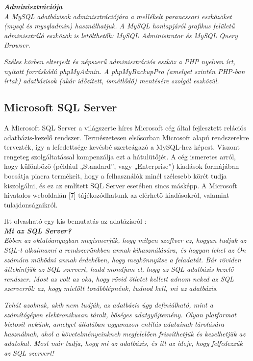 \noindent\textit{\textbf{Adminisztrációja}}\\

\textit{A MySQL adatbázisok adminisztrációjára a mellékelt parancssori eszközöket (mysql és mysqladmin) használhatjuk. A MySQL honlapjáról grafikus felületű adminisztráló eszközök is letölthetők: MySQL Administrator és MySQL Query Browser.}

\textit{Széles körben elterjedt és népszerű adminisztrációs eszköz a PHP nyelven írt, nyitott forráskódú phpMyAdmin. A phpMyBackupPro (amelyet szintén PHP-ban írtak) adatbázisok (akár időzített, ismétlődő) mentésére szolgál eszközül.}


\subsection{Microsoft SQL Server}

A Microsoft SQL Server a világszerte híres Microsoft cég által fejlesztett relációs adatbázis-kezelő rendszer.
Természetesen elsősorban Microsoft alapú rendszerekre tervezték, így a lefedettsége kevésbé szerteágazó a MySQL-hez képest. Viszont rengeteg szolgáltatással kompenzálja ezt a hátulütőjét.
A cég ismeretes arról, hogy különböző (például „Standard”, vagy „Enterprise”) kiadások formájában bocsátja piacra termékeit, hogy a felhasználók minél szélesebb körét tudja kiszolgálni, és ez az említett SQL Server esetében sincs másképp. A Microsoft hivatalos weboldalán [7] tájékozódhatunk az elérhető kiadásokról, valamint tulajdonságaikról.

Itt olvasható egy kis bemutatás az adatázisról \cite{mssqlcikk}:\\

\noindent\textit{\textbf{\large{Mi az SQL Server?}}}\\

\textit{Ebben az oktatóanyagban megismerjük, hogy milyen szoftver ez, hogyan tudjuk az SQL-t alkalmazni a rendszerünkben annak kihasználására, és hogyan lehet az Ön számára működni annak érdekében, hogy megkönnyítse a feladatát. Bár röviden áttekintjük az SQL szervert, hadd mondjam el, hogy az SQL adatbázis-kezelő rendszer. Most az volt az oka, hogy rövid ötletet kellett adnom neked az SQL szerverről: az, hogy mielőtt továbblépnénk, tudnod kell, mi az adatbázis.}

\textit{Tehát azoknak, akik nem tudják, az adatbázis úgy definiálható, mint a számítógépen elektronikusan tárolt, bőséges adatgyűjtemény. Olyan platformot biztosít nekünk, amelyet általában ugyanazon entitás adatainak tárolására használnak, ahol a követelményeinknek megfelelően frissíthetjük és kezelhetjük az adatokat. Most már tudja, hogy mi az adatbázis, és itt az ideje, hogy felfedezzük az SQL szervert!}\\

